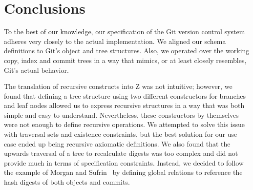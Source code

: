 \section{Conclusions}

To the best of our knowledge, our specification of the Git version control
system adheres very closely to the actual implementation. We aligned our schema
definitions to Git's object and tree structures. Also, we operated over the
working copy, index and commit trees in a way that mimics, or at least closely
resembles, Git's actual behavior.

The translation of recursive constructs into Z was not intuitive; however, we
found that defining a tree structure using two different constructors for
branches and leaf nodes allowed us to express recursive structures in a way that
was both simple and easy to understand. Nevertheless, these constructors by
themselves were not enough to define recursive operations. We attempted to solve
this issue with traversal sets and existence constraints, but the best solution
for our use case ended up being recursive axiomatic definitions. We also found
that the upwards traversal of a tree to recalculate digests was too complex and
did not provide much in terms of specification constraints. Instead, we decided
to follow the example of Morgan and Sufrin~\cite{morgan} by defining global
relations to reference the hash digests of both objects and commits.

